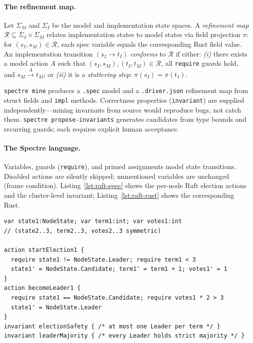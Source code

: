 \documentclass[runningheads]{../paper-vmcai-2027/llncs}
\begin{document}
\paragraph{The refinement map.}
Let $\Sigma_M$ and $\Sigma_I$ be the model and implementation state spaces.
A \emph{refinement map} $\mathcal{R}\subseteq\Sigma_I\times\Sigma_M$ relates
implementation states to model states via field projection $\pi$: for
$(s_I,s_M)\in\mathcal{R}$, each spec variable equals the corresponding Rust
field value.
An implementation transition $(s_I\to t_I)$ \emph{conforms} to $\mathcal{R}$
if either: \emph{(i)} there exists a model action $A$ such that
$(s_I,s_M),(t_I,t_M)\in\mathcal{R}$, all \texttt{require} guards hold, and
$s_M\xrightarrow{A}t_M$; or \emph{(ii)} it is a \emph{stuttering step}:
$\pi(s_I)=\pi(t_I)$.

\texttt{spectre mine} produces a \texttt{.spec} model and a
\texttt{.driver.json} refinement map from struct fields and \texttt{impl}
methods.
Correctness properties (\texttt{invariant}) are supplied independently---mining
invariants from source would reproduce bugs, not catch them.
\texttt{spectre propose-invariants} generates candidates from type bounds and
recurring guards; each requires explicit human acceptance.

\paragraph{The Spectre language.}
Variables, guards (\texttt{require}), and primed assignments model state
transitions.
Disabled actions are silently skipped; unmentioned variables are unchanged
(frame condition).
Listing~\ref{lst:raft-spec} shows the per-node Raft election actions and
the cluster-level invariant; Listing~\ref{lst:raft-rust} shows the
corresponding Rust.

\begin{lstlisting}[language=Spectre,
  caption={3-node Raft spec: per-node variables; 3 instances composed to form cluster.},
  label={lst:raft-spec}]
var state1:NodeState; var term1:int; var votes1:int
// (state2..3, term2..3, votes2..3 symmetric)

action startElection1 {
  require state1 != NodeState.Leader; require term1 < 3
  state1' = NodeState.Candidate; term1' = term1 + 1; votes1' = 1
}
action becomeLeader1 {
  require state1 == NodeState.Candidate; require votes1 * 2 > 3
  state1' = NodeState.Leader
}
invariant electionSafety { /* at most one Leader per term */ }
invariant leaderMajority { /* every Leader holds strict majority */ }
\end{lstlisting}
\end{document}

